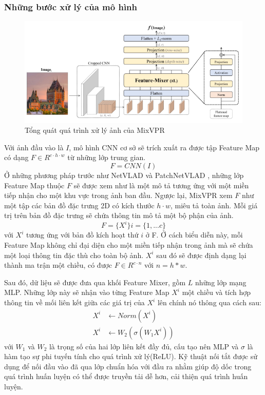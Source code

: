 \subsubsection*{Những bước xử lý của mô hình}
\begin{figure}[H]
    \centering
    \includegraphics[scale=0.7]{pics/Proposal/mixvpr.png}
    \caption{Tổng quát quá trình xử lý ảnh của MixVPR \cite{alibey2023mixvpr}}
\end{figure}
Với ảnh đầu vào là $I$, mô hình CNN cơ sở sẽ trích xuất ra được tập Feature Map có dạng $F \in R^{c \cdot h \cdot w}$ từ những lớp trung gian.
$$
F = CNN(I)
$$
Ở những phương pháp trước như NetVLAD \cite{arandjelović2016netvlad} và PatchNetVLAD \cite{hausler2021patchnetvlad}, những lớp Feature Map thuộc $F$ sẽ được xem như là một mô tả tương ứng với một miền tiếp nhận cho một khu vực trong ảnh ban đầu. Ngược lại, MixVPR xem $F$ như một tập các bản đồ đặc trưng 2D có kích thước $h \cdot w$, miêu tả toàn ảnh. Mỗi giá trị trên bản đồ đặc trưng sẽ chứa thông tin mô tả một bộ phận của ảnh.
$$
F = \{X^{i}\}    i = \{1,...c\}
$$
với $X^{i}$ tương ứng với bản đồ kích hoạt thứ $i$ ở F. Ở cách biểu diễn này, mỗi Feature Map không chỉ đại diện cho một miền tiếp nhận trong ảnh mà sẽ chứa một loại thông tin đặc thù cho toàn bộ ảnh. $X^{i}$ sau đó sẽ được định dạng lại thành ma trận một chiều, có được $F \in R^{c \cdot n}$ với $n = h*w$.

Sau đó, dữ liệu sẽ được đưa qua khối Feature Mixer, gồm $L$ những lớp mạng MLP. Những lớp này sẽ nhận vào từng Feature Map $X^{i}$ một chiều và tích hợp thông tin về mối liên kết giữa các giá trị của $X^{i}$ lên chính nó thông qua cách sau:
$$
\begin{aligned}
    X^{i} & \leftarrow Norm(X^{i}) \\
    X^{i} & \leftarrow W_2(\sigma(W_1 X^{i}))
\end{aligned}
$$
với $W_1$ và $W_2$ là trọng số của hai lớp liên kết đầy đủ, cấu tạo nên MLP và $\sigma$ là hàm tạo sự phi tuyến tính cho quá trình xử lý(ReLU). Kỹ thuật nối tắt được sử dụng để nối đầu vào đã qua lớp chuẩn hóa với đầu ra nhằm giúp độ dốc trong quá trình huấn luyện có thể được truyền tải dễ hơn, cải thiện quá trình huấn luyện.

